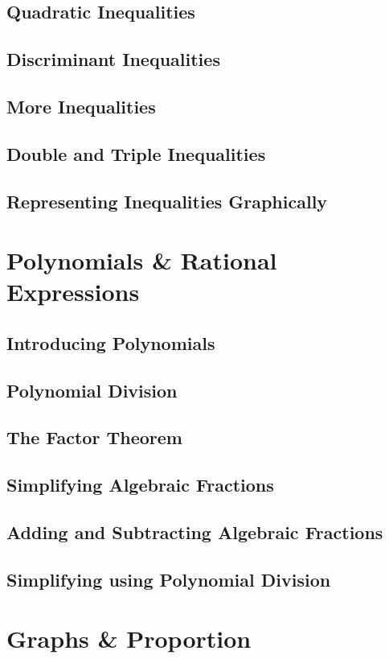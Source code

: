 \documentclass[../alevelmaths.tex]{subfiles}
\begin{document}
\subsection*{Quadratic Inequalities}
\subsection*{Discriminant Inequalities}
\subsection*{More Inequalities}
\subsection*{Double and Triple Inequalities}
\subsection*{Representing Inequalities Graphically}
\section{Polynomials \& Rational Expressions}
\subsection*{Introducing Polynomials}
\subsection*{Polynomial Division}
\subsection*{The Factor Theorem}
\subsection*{Simplifying Algebraic Fractions}
\subsection*{Adding and Subtracting Algebraic Fractions}
\subsection*{Simplifying using Polynomial Division}
\section{Graphs \& Proportion}
\end{document}
